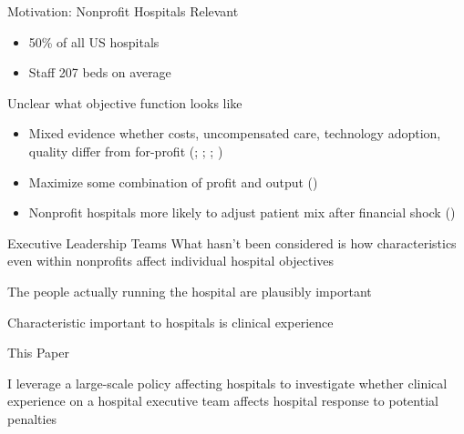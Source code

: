 \documentclass[notes,11pt, aspectratio=169]{beamer}
\newenvironment{wideitemize}{\itemize\addtolength{\itemsep}{10pt}}{\enditemize}
\begin{document}
\begin{frame}{Motivation: Nonprofit Hospitals}
    Relevant 
    \begin{itemize}
        \item 50\% of all US hospitals
        \item Staff 207 beds on average
    \end{itemize}

    \vspace{5mm}

    Unclear what objective function looks like 
    \begin{itemize}
        \item Mixed evidence whether costs, uncompensated care, technology adoption, quality differ from for-profit (\cite{sloan2000not}; \cite{eggleston2008hospital}; \cite{moscelli2018effect}; \cite{moscone2020public})
        \item Maximize some combination of profit and output (\cite{deneffe2002not})
        \item Nonprofit hospitals more likely to adjust patient mix after financial shock (\cite{chang2011nonprofit})
    \end{itemize}
\end{frame}

\begin{frame}{Executive Leadership Teams}
    What hasn't been considered is how characteristics even within nonprofits affect individual hospital objectives
    \begin{wideitemize}
        \item The people actually running the hospital are plausibly important
        \item Characteristic important to hospitals is clinical experience 
    \end{wideitemize}
\end{frame}

\begin{frame}{This Paper}
    \begin{block}{}
        I leverage a large-scale policy affecting hospitals to investigate whether clinical experience on a hospital executive team affects hospital response to potential penalties
    \end{block}
\end{frame}
\end{document}
